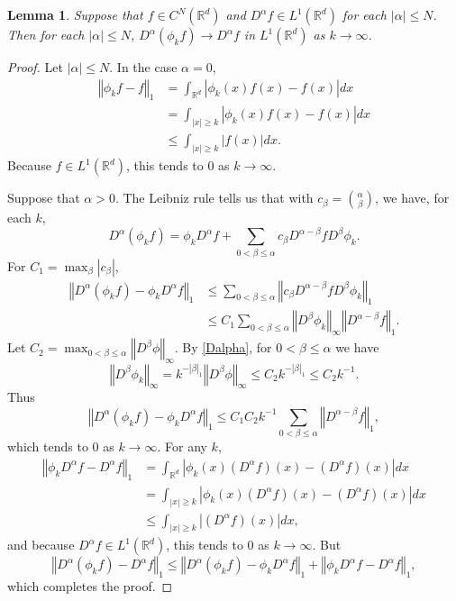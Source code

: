 \documentclass{article}
\newcommand{\norm}[1]{\left\Vert #1 \right\Vert}
\newtheorem{lemma}[theorem]{Lemma}
\theoremstyle{definition}
\begin{document}
\begin{lemma}
Suppose that $f \in C^N(\mathbb{R}^d)$ and $D^\alpha f \in L^1(\mathbb{R}^d)$ for each $|\alpha| \leq N$.
Then
for each $|\alpha| \leq N$, $D^\alpha  (\phi_k f) \to D^\alpha f$ in $L^1(\mathbb{R}^d)$ as $k \to \infty$.
\label{testfunction}
\end{lemma}
\begin{proof}
Let $|\alpha| \leq N$.
In the case $\alpha=0$,
\begin{align*}
\norm{\phi_k f-f}_1 &= \int_{\mathbb{R}^d} |\phi_k(x) f(x)-f(x)| dx\\
&=\int_{|x| \geq k} |\phi_k(x)f(x)-f(x)| dx\\
&\leq \int_{|x| \geq k} |f(x)| dx.
\end{align*}
Because $f \in L^1(\mathbb{R}^d)$, this tends to $0$ as $k \to \infty$.

Suppose that $\alpha>0$.
The Leibniz rule tells us that with $c_\beta =\binom{\alpha}{\beta}$, we have, for each $k$,
\[
D^\alpha(\phi_k f) = \phi_k D^\alpha f + \sum_{0<\beta \leq \alpha} c_\beta D^{\alpha-\beta} f D^\beta \phi_k.
\]
For $C_1=\max_\beta |c_\beta|$,
\begin{align*}
\norm{D^\alpha(\phi_k f)-\phi_k D^\alpha f}_1&\leq \sum_{0<\beta \leq \alpha} \norm{c_\beta D^{\alpha-\beta} f D^\beta \phi_k}_1\\
&\leq C_1 \sum_{0<\beta \leq \alpha} \norm{D^\beta \phi_k}_\infty \norm{D^{\alpha-\beta} f}_1.
\end{align*}
Let $C_2 = \max_{0<\beta \leq \alpha} \norm{D^\beta \phi}_\infty$. By \eqref{Dalpha}, for $0<\beta \leq \alpha$ we have
\[
\norm{D^\beta \phi_k}_\infty = k^{-|\beta|_1} \norm{D^\beta \phi}_\infty \leq C_2 k^{-|\beta|_1} \leq C_2 k^{-1}.
\]
Thus
\[
\norm{D^\alpha(\phi_k f)-\phi_k D^\alpha f}_1 \leq C_1 C_2 k^{-1} \sum_{0<\beta \leq \alpha} \norm{D^{\alpha-\beta}f}_1,
\]
which tends to $0$ as $k \to \infty$.
For any $k$,
\begin{align*}
\norm{\phi_k D^\alpha f - D^\alpha f}_1 &=\int_{\mathbb{R}^d} |\phi_k(x) (D^\alpha f)(x)-(D^\alpha f)(x)| dx\\
&=\int_{|x| \geq k} |\phi_k(x) (D^\alpha f)(x)-(D^\alpha f)(x)| dx\\
&\leq \int_{|x| \geq k} |(D^\alpha f)(x)| dx,
\end{align*}
and because $D^\alpha f \in L^1(\mathbb{R}^d)$, this tends to $0$ as $k \to \infty$.
But
\[
\norm{D^\alpha (\phi_k f)-D^\alpha f}_1 \leq
\norm{D^\alpha (\phi_k f)-\phi_k D^\alpha f}_1
+\norm{\phi_k D^\alpha f-D^\alpha f}_1,
\]
which completes the proof.
\end{proof}
\end{document}
